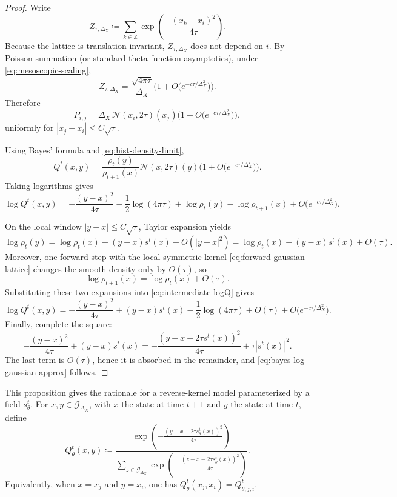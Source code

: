 \documentclass[11pt]{article}
\begin{document}
\begin{proof}
Write
\[
Z_{\tau,\Delta_X}
\coloneqq
\sum_{k\in\mathbb Z}\exp\!\left(-\frac{(x_k-x_i)^2}{4\tau}\right).
\]
Because the lattice is translation-invariant, $Z_{\tau,\Delta_X}$ does not depend on $i$. By Poisson summation (or standard theta-function asymptotics), under \eqref{eq:mesoscopic-scaling},
\begin{equation}
\label{eq:lattice-gaussian-normalizer}
Z_{\tau,\Delta_X}
=
\frac{\sqrt{4\pi\tau}}{\Delta_X}
\Big(1+O\!\big(e^{-c\tau/\Delta_X^2}\big)\Big).
\end{equation}
Therefore
\[
P_{i,j}
=
\Delta_X\,\mathcal N(x_i,2\tau)(x_j)
\Big(1+O\!\big(e^{-c\tau/\Delta_X^2}\big)\Big),
\]
uniformly for $|x_j-x_i|\le C\sqrt{\tau}$.

Using Bayes' formula and \eqref{eq:hist-density-limit},
\[
Q^t(x,y)
=
\frac{\rho_t(y)}{\rho_{t+1}(x)}
\mathcal N(x,2\tau)(y)
\Big(1+O\!\big(e^{-c\tau/\Delta_X^2}\big)\Big).
\]
Taking logarithms gives
\begin{equation}
\label{eq:intermediate-logQ}
\log Q^t(x,y)
=
-\frac{(y-x)^2}{4\tau}
-\frac12\log(4\pi\tau)
+\log \rho_t(y)-\log \rho_{t+1}(x)
+O\!\big(e^{-c\tau/\Delta_X^2}\big).
\end{equation}

On the local window $|y-x|\le C\sqrt{\tau}$, Taylor expansion yields
\[
\log \rho_t(y)
=
\log \rho_t(x)
+(y-x)s^t(x)
+O(|y-x|^2)
=
\log \rho_t(x)
+(y-x)s^t(x)
+O(\tau).
\]
Moreover, one forward step with the local symmetric kernel \eqref{eq:forward-gaussian-lattice} changes the smooth density only by $O(\tau)$, so
\[
\log \rho_{t+1}(x)=\log \rho_t(x)+O(\tau).
\]
Substituting these two expansions into \eqref{eq:intermediate-logQ} gives
\[
\log Q^t(x,y)
=
-\frac{(y-x)^2}{4\tau}
+(y-x)s^t(x)
-\frac12\log(4\pi\tau)
+O(\tau)
+O\!\big(e^{-c\tau/\Delta_X^2}\big).
\]
Finally, complete the square:
\[
-\frac{(y-x)^2}{4\tau}+(y-x)s^t(x)
=
-\frac{(y-x-2\tau s^t(x))^2}{4\tau}
+\tau |s^t(x)|^2.
\]
The last term is $O(\tau)$, hence it is absorbed in the remainder, and \eqref{eq:bayes-log-gaussian-approx} follows.
\end{proof}

This proposition gives the rationale for a reverse-kernel model parameterized by a field $s_\theta^t$. For $x,y\in\mathcal G_{\Delta_X}$, with $x$ the state at time $t+1$ and $y$ the state at time $t$, define
\begin{equation}
\label{eq:qtheta-discrete-grid}
Q_\theta^t(x,y)
\coloneqq
\frac{\exp\!\left(-\frac{(y-x-2\tau s_\theta^t(x))^2}{4\tau}\right)}
{\sum_{z\in\mathcal G_{\Delta_X}}\exp\!\left(-\frac{(z-x-2\tau s_\theta^t(x))^2}{4\tau}\right)}.
\end{equation}
Equivalently, when $x=x_j$ and $y=x_i$, one has $Q_\theta^t(x_j,x_i)=Q_{\theta,j,i}^t$.
\end{document}
